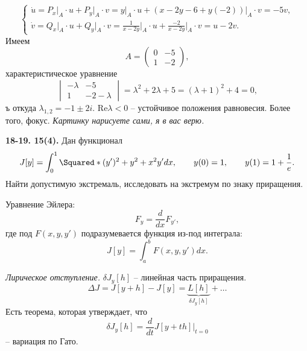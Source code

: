 \begin{equation*}
    \begin{cases}
        \dot u = P_x\bigr|_A\cdot u + P_y\bigr|_A \cdot v = y\bigr|_A\cdot u + (x - 2y - 6 + y(-2))\bigr|_A \cdot v = -5v, \\ 
        \dot v = Q_x\bigr|_A\cdot u + Q_y\bigr|_A \cdot v = \frac{1}{x - 2y}\bigr|_A\cdot u + \frac{-2}{x - 2y}\bigr|_A \cdot v = u - 2v.
    \end{cases}
\end{equation*}
Имеем 
\begin{equation*}
    A = \begin{pmatrix}
        0 & -5 \\ 1 & -2
    \end{pmatrix},
\end{equation*}
характеристическое уравнение
\begin{equation*}
    \begin{vmatrix}
        -\lambda & -5 \\ 1 & -2-\lambda
    \end{vmatrix} = \lambda^2 + 2\lambda + 5 = (\lambda + 1)^2 + 4 = 0,
\end{equation*}ъ
откуда $\lambda_{1, 2} = -1 \pm 2i$. $\mathrm{Re} \lambda < 0$ -- устойчивое положения равновесия. Более того, фокус. \textit{Картинку нарисуете сами, я в вас верю.}

\begin{task}
    \textbf{18-19. 15(4).} Дан функционал
    \begin{equation*}
        J[y] = \int_0^1 \Squared*{(y')^2 + y^2 + x^2y'}dx, \hspace{2em} y(0) = 1, \hspace{2em} y(1) = 1 + \frac 1e.
    \end{equation*}
    Найти допустимую экстремаль, исследовать на экстремум по знаку приращения.
\end{task}

Уравнение Эйлера:
\begin{equation*}
    F_y = \frac{d}{dx}F_{y'},
\end{equation*}
где под $F(x, y, y')$ подразумевается функция из-под интеграла:
\begin{equation*}
    J[y] = \int_a^b F(x, y, y') dx.
\end{equation*}

\textit{Лирическое отступление.} $\delta J_y[h]$ -- линейная часть приращения.
\begin{equation*}
    \Delta J = J[y + h] - J[y] = \underbrace{L[h]}_{\delta J_y[h]} + \ldots
\end{equation*}
Есть теорема, которая утверждает, что
\begin{equation*}
    \delta J_y[h] = \frac{d}{dt} J[y + th]\bigr|_{t = 0}
\end{equation*}
-- вариация по Гато.

